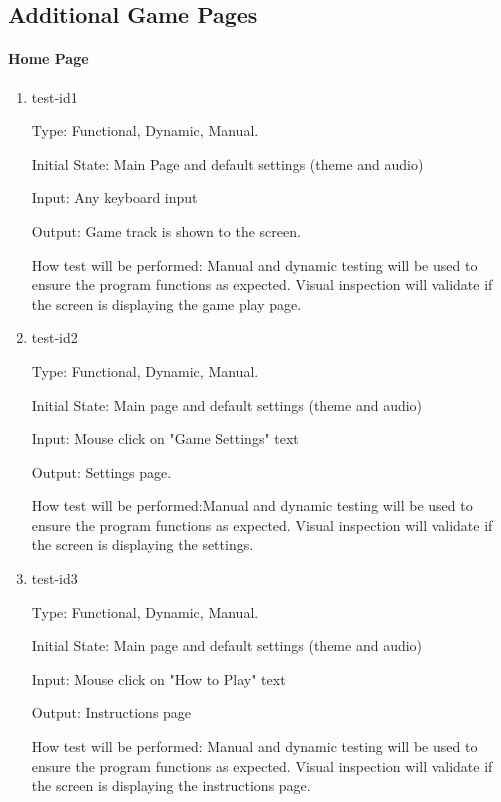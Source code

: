 \documentclass[12pt, titlepage]{article}
\begin{document}
\subsection{Additional Game Pages}



\paragraph{Home Page}

\begin{enumerate}
	
	\item{test-id1\\}
	
	Type: Functional, Dynamic, Manual. 
	
	Initial State: Main Page and default settings (theme and audio)
	
	Input: Any keyboard input 
	
	Output: Game track is shown to the screen. 
	
	How test will be performed: Manual and dynamic testing will be used to ensure the program functions as expected. Visual inspection will validate if the screen is displaying the game play page. 
	
	\item{test-id2\\}
	
	Type: Functional, Dynamic, Manual.
	
	Initial State: Main page and default settings (theme and audio) 
	
	Input: Mouse click on "Game Settings" text
	
	Output: Settings page. 
	
	How test will be performed:Manual and dynamic testing will be used to ensure the program functions as expected. Visual inspection will validate if the screen is displaying the settings.  
	
	\item{test-id3\\}
	
	Type: Functional, Dynamic, Manual.
	
	Initial State: Main page and default settings (theme and audio) 
	
	Input: Mouse click on "How to Play" text
	
	Output: Instructions page
	
	How test will be performed: Manual and dynamic testing will be used to ensure the program functions as expected. Visual inspection will validate if the screen is displaying the instructions page. 
	
\end{enumerate}
\end{document}
